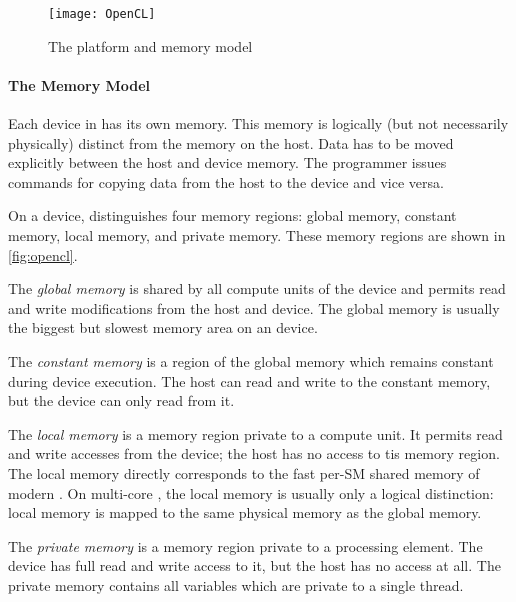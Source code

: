 \begin{figure}
  \centering
  \texttt{[image: OpenCL]}
  \caption{The \OpenCL platform and memory model}
  \label{fig:opencl}
\end{figure}

\paragraph{The \OpenCL Memory Model}
Each device in \OpenCL has its own memory.
This memory is logically (but not necessarily physically) distinct from the memory on the host.
Data has to be moved explicitly between the host and device memory.
The programmer issues commands for copying data from the host to the device and vice versa.

On a device, \OpenCL distinguishes four memory regions:
global memory, constant memory, local memory, and private memory.
These memory regions are shown in \autoref{fig:opencl}.

The \emph{global memory} is shared by all compute units of the device and permits read and write modifications from the host and device.
The global memory is usually the biggest but slowest memory area on an \OpenCL device.

The \emph{constant memory} is a region of the global memory which remains constant during device execution.
The host can read and write to the constant memory, but the device can only read from it.

The \emph{local memory} is a memory region private to a compute unit.
It permits read and write accesses from the device; the host has no access to tis memory region.
The local memory directly corresponds to the fast per-SM shared memory of modern \GPUs.
On multi-core \CPUs, the local memory is usually only a logical distinction:
local memory is mapped to the same physical memory as the global memory.

The \emph{private memory} is a memory region private to a processing element.
The device has full read and write access to it, but the host has no access at all.
The private memory contains all variables which are private to a single thread.


